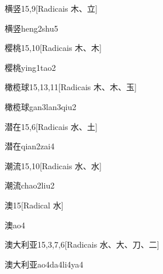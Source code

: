 \begin{entry}{横竖}{15,9}[Radicais ⽊、⽴]
  \begin{phonetics}{横竖}{heng2shu5}
  \end{phonetics}
\end{entry}

\begin{entry}{樱桃}{15,10}[Radicais ⽊、⽊]
  \begin{phonetics}{樱桃}{ying1tao2}
  \end{phonetics}
\end{entry}

\begin{entry}{橄榄球}{15,13,11}[Radicais ⽊、⽊、⽟]
  \begin{phonetics}{橄榄球}{gan3lan3qiu2}
  \end{phonetics}
\end{entry}

\begin{entry}{潜在}{15,6}[Radicais ⽔、⼟]
  \begin{phonetics}{潜在}{qian2zai4}
  \end{phonetics}
\end{entry}

\begin{entry}{潮流}{15,10}[Radicais ⽔、⽔]
  \begin{phonetics}{潮流}{chao2liu2}
  \end{phonetics}
\end{entry}

\begin{entry}{澳}{15}[Radical ⽔]
  \begin{phonetics}{澳}{ao4}
  \end{phonetics}
\end{entry}

\begin{entry}{澳大利亚}{15,3,7,6}[Radicais ⽔、⼤、⼑、⼆]
  \begin{phonetics}{澳大利亚}{ao4da4li4ya4}
  \end{phonetics}
\end{entry}

